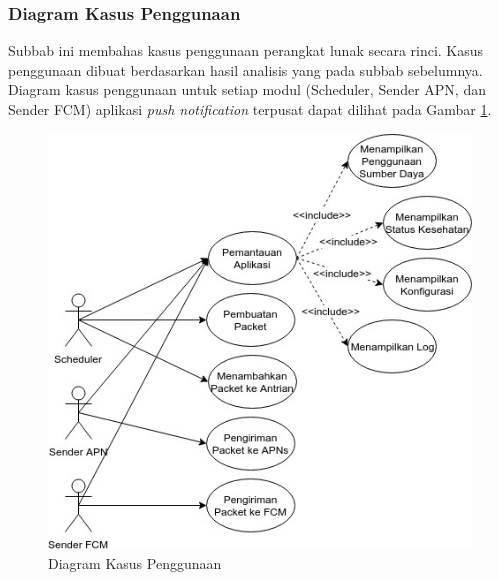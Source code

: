 \subsubsection{Diagram Kasus Penggunaan}
\par Subbab ini membahas kasus penggunaan perangkat lunak secara rinci. Kasus penggunaan dibuat berdasarkan hasil analisis yang pada subbab sebelumnya. Diagram kasus penggunaan untuk setiap modul (Scheduler, Sender APN, dan Sender FCM) aplikasi \textit{push notification} terpusat dapat dilihat pada Gambar \ref{diagram_kasus_penggunaan}.
\begin{figure}[H]
	\caption{Diagram Kasus Penggunaan} \label{diagram_kasus_penggunaan}
    \includegraphics[width=1\textwidth]{bab3/figures/diagram_kasus_penggunaan.jpg}
\end{figure}

\newcommand\tableUcDesc[8] {
\begin{longtable}{|p{2.5cm}|p{6.5cm}|}
	\caption{Kasus Penggunaan #3} \label{#1} \\ \hline
    \rowcolor{lightgray} Komponen & Deskripsi \\ \hline
    Kode & #2 \\ \hline
    Nama & #3 \\ \hline
    Aktor & #4 \\ \hline
    Kondisi Awal & #5 \\ \hline
    Kondisi Akhir & #6 \\ \hline
    Alur Normal & #7 \\ \hline
    Alur Alternatif & #8 \\ \hline
\end{longtable}
}

